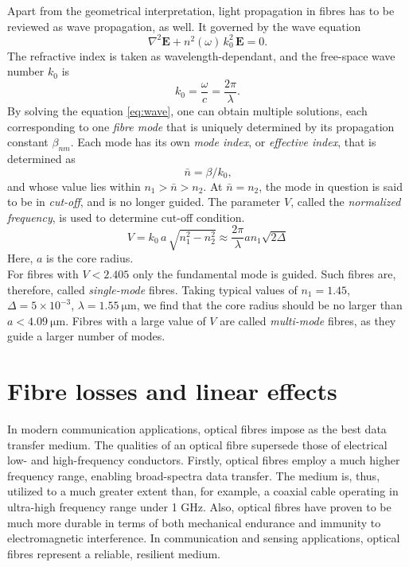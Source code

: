 \documentclass{standalone}
\begin{document}
Apart from the geometrical interpretation, light propagation in fibres has to be reviewed as wave propagation, as well. It governed by the wave equation
\begin{equation} \label{eq:wave}
\nabla^2 \mathbf{E} + n^2(\omega) \, k_0^2 \, \mathbf{E} = 0 \textrm{.}
\end{equation}
The refractive index is taken as wavelength-dependant, and the free-space wave number $k_0$ is
\begin{equation}
k_0 = \frac{\omega}{c} = \frac{2 \pi}{\lambda} \textrm{.}
\end{equation}
By solving the equation \ref{eq:wave}, one can obtain multiple solutions, each corresponding to one \textit{fibre mode} that is uniquely determined by its propagation constant $\beta_{nm}$. Each mode has its own \textit{mode index}, or \textit{effective index}, that is determined as
\begin{equation}
\bar{n} = \beta/k_0 \textrm{,}
\end{equation}
and whose value lies within $n_1 > \bar{n} > n_2$. At $\bar{n} = n_2$, the mode in question is said to be in \textit{cut-off}, and is no longer guided. The parameter $V$, called the \textit{normalized frequency}, is used to determine cut-off condition.
\begin{equation}
V = k_0 \, a \, \sqrt{n_1^2 - n_2^2} \approx \frac{2 \pi}{\lambda} a n_1 \sqrt{2 \varDelta}
\end{equation}
Here, $a$ is the core radius. \\

For fibres with $V < 2.405$ only the fundamental mode is guided. Such fibres are, therefore, called \textit{single-mode} fibres. Taking typical values of $n_1 = 1.45$, $\varDelta = 5 \times 10^{-3}$, $\lambda = \SI{1.55}{\micro \meter}$, we find that the core radius should be no larger than $a < \SI{4.09}{\micro \meter}$. Fibres with a large value of $V$ are called \textit{multi-mode} fibres, as they guide a larger number of modes.


\section{Fibre losses and linear effects}

In modern communication applications, optical fibres impose as the best data transfer medium. The qualities of an optical fibre supersede those of electrical low- and high-frequency conductors. Firstly, optical fibres employ a much higher frequency range, enabling broad-spectra data transfer. The medium is, thus, utilized to a much greater extent than, for example, a coaxial cable operating in ultra-high frequency range under 1 GHz. Also, optical fibres have proven to be much more durable in terms of both mechanical endurance and immunity to electromagnetic interference. In communication and sensing applications, optical fibres represent a reliable, resilient medium. \\
\end{document}
